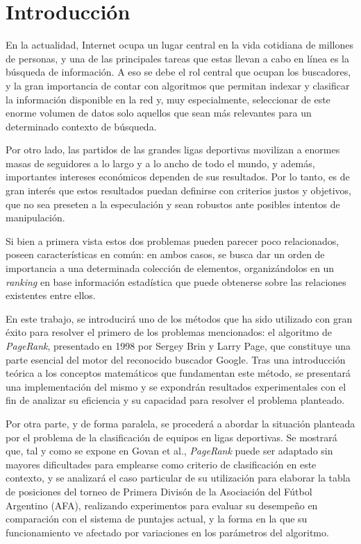 \section{Introducción}

    En la actualidad, Internet ocupa un lugar central en la vida cotidiana de millones de personas, y una de las principales tareas que estas llevan a cabo en línea es la búsqueda de información. A eso se debe el rol central que ocupan los buscadores, y la gran importancia de contar con algoritmos que permitan indexar y clasificar la información disponible en la red y, muy especialmente, seleccionar de este enorme volumen de datos solo aquellos que sean más relevantes para un determinado contexto de búsqueda.

    Por otro lado, las partidos de las grandes ligas deportivas movilizan a enormes masas de seguidores a lo largo y a lo ancho de todo el mundo, y además, importantes intereses económicos dependen de sus resultados. Por lo tanto, es de gran interés que estos resultados puedan definirse con criterios justos y objetivos, que no sea preseten a la especulación y sean robustos ante posibles intentos de manipulación.

    Si bien a primera vista estos dos problemas pueden parecer poco relacionados, poseen características en común: en ambos casos, se busca dar un orden de importancia a una determinada colección de elementos, organizándolos en un \emph{ranking} en base información estadística que puede obtenerse sobre las relaciones existentes entre ellos.

    En este trabajo, se introducirá uno de los métodos que ha sido utilizado con gran éxito para resolver el primero de los problemas mencionados: el algoritmo de \emph{PageRank}, presentado en 1998 por Sergey Brin y Larry Page\cite{Brin1998}, que constituye una parte esencial del motor del reconocido buscador Google. Tras una introducción teórica a los conceptos matemáticos que fundamentan este método, se presentará una implementación del mismo y se expondrán resultados experimentales con el fin de analizar su eficiencia y su capacidad para resolver el problema planteado.

    Por otra parte, y de forma paralela, se procederá a abordar la situación planteada por el problema de la clasificación de equipos en ligas deportivas. Se mostrará que, tal y como se expone en Govan et al.\cite{Govan2008}, \emph{PageRank} puede ser adaptado sin mayores dificultades para emplearse como criterio de clasificación en este contexto, y se analizará el caso particular de su utilización para elaborar la tabla de posiciones del torneo de Primera Divisón de la Asociación del Fútbol Argentino (AFA), realizando experimentos para evaluar su desempeño en comparación con el sistema de puntajes actual, y la forma en la que su funcionamiento ve afectado por variaciones en los parámetros del algoritmo.

